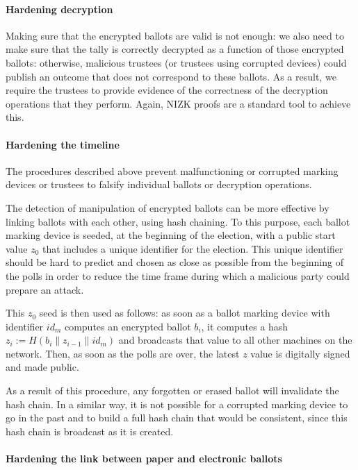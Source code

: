 \documentclass[letterpaper, 10pt, twocolumn]{article}
\begin{document}
\paragraph{Hardening decryption}
\label{sec:hardening-decryption}
Making sure that the encrypted ballots are valid is not enough: we
also need to make sure that the tally is correctly decrypted as a
function of those encrypted ballots: otherwise, malicious trustees (or
trustees using corrupted devices) could publish an outcome that does
not correspond to these ballots. As a result, we require the trustees
to provide evidence of the correctness of the decryption operations
that they perform.  Again, NIZK proofs are a standard tool to achieve
this.

\paragraph{Hardening the timeline}
\label{sec:hard-timeline}

The procedures described above prevent malfunctioning or corrupted
marking devices or trustees to falsify individual ballots or decryption
operations.

The detection of manipulation of encrypted ballots can be more
effective by linking ballots with each other, using hash chaining.  To
this purpose, each ballot marking device is seeded, at the beginning
of the election, with a public start value $z_0$ that includes a
unique identifier for the election. This unique identifier should be
hard to predict and chosen as close as possible from the beginning of
the polls in order to reduce the time frame during which a malicious
party could prepare an attack.

This $z_0$ seed is then used as follows: as soon as a ballot marking
device with identifier $id_m$ computes an encrypted ballot $b_i$, it
computes a hash $z_i := H(b_i \| z_{i-1} \| id_m)$ and broadcasts that
value to all other machines on the network. Then, as soon as the polls
are over, the latest $z$ value is digitally signed and made public.

As a result of this procedure, any forgotten or erased ballot will
invalidate the hash chain. In a similar way, it is not possible for a
corrupted marking device to go in the past and to build a full hash
chain that would be consistent, since this hash chain is broadcast as
it is created.

\paragraph{Hardening the link between paper and electronic ballots}
\label{sec:hard-link-betw}
\end{document}
